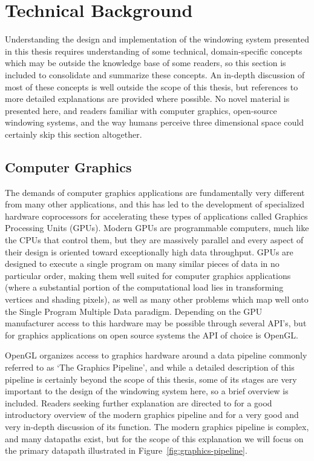 \chapter{Technical Background}
\label{sec:tech-background}
Understanding the design and implementation of the windowing system presented in this thesis requires understanding of some technical, domain-specific concepts which may be outside the knowledge base of some readers, so this section is included to consolidate and summarize these concepts. An in-depth discussion of most of these concepts is well outside the scope of this thesis, but references to more detailed explanations are provided where possible. No novel material is presented here, and readers familiar with computer graphics, open-source windowing systems, and the way humans perceive three dimensional space could certainly skip this section altogether.

\section{Computer Graphics}
\label{sec:graphics-pipeline}
The demands of computer graphics applications are fundamentally very different from many other applications, and this has led to the development of specialized hardware coprocessors for accelerating these types of applications called Graphics Processing Units (GPUs). Modern GPUs are programmable computers, much like the CPUs that control them, but they are massively parallel and every aspect of their design is oriented toward exceptionally high data throughput. GPUs are designed to execute a single program on many similar pieces of data in no particular order, making them well suited for computer graphics applications (where a substantial portion of the computational load lies in transforming vertices and shading pixels), as well as many other problems which map well onto the Single Program Multiple Data paradigm. Depending on the GPU manufacturer access to this hardware may be possible through several API’s, but for graphics applications on open source systems the API of choice is OpenGL.
		
OpenGL organizes access to graphics hardware around a data pipeline commonly referred to as ‘The Graphics Pipeline’, and while a detailed description of this pipeline is certainly beyond the scope of this thesis, some of its stages are very important to the design of the windowing system here, so a brief overview is included. Readers seeking further explanation are directed to \cite{graphics-intro} for a good introductory overview of the modern graphics pipeline and \cite{trip-through-pipeline} for a very good and very in-depth discussion of its function. The modern graphics pipeline is complex, and many datapaths exist, but for the scope of this explanation we will focus on the primary datapath illustrated in Figure~\ref{fig:graphics-pipeline}.

